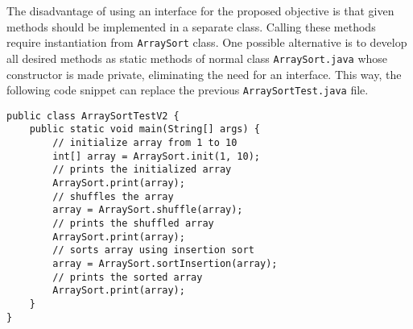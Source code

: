 \begin{enumerate}
The disadvantage of using an interface for the proposed objective is that given methods should be implemented in a separate class. Calling these methods require instantiation from \texttt{ArraySort} class. One possible alternative is to develop all desired methods as static methods of normal class \texttt{ArraySort.java} whose constructor is made private, eliminating the need for an interface. This way, the following code snippet can replace the previous \texttt{ArraySortTest.java} file.

\lstset{language=java,tabsize=2}
\begin{lstlisting}
public class ArraySortTestV2 {
	public static void main(String[] args) {
		// initialize array from 1 to 10
		int[] array = ArraySort.init(1, 10);
		// prints the initialized array
		ArraySort.print(array);
		// shuffles the array
		array = ArraySort.shuffle(array);
		// prints the shuffled array
		ArraySort.print(array);
		// sorts array using insertion sort
		array = ArraySort.sortInsertion(array);
		// prints the sorted array
		ArraySort.print(array);
	}
}
\end{lstlisting}

\end{enumerate}
